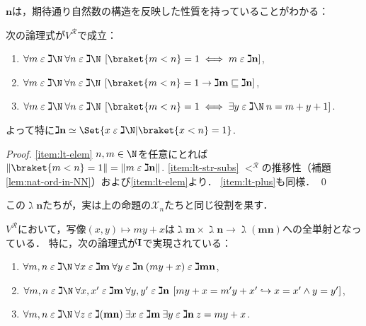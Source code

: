 \documentclass[realisability.tex]{subfiles}
\begin{document}
$\mathbf{n}$は，期待通り自然数の構造を反映した性質を持っていることがわかる：
\begin{lemma}\label{lem:gimel-n-props}
 次の論理式が$V^{\mathcal{R}}$で成立：
 \begin{enumerate}
  \item \label{item:lt-elem}$\forall m \strin \gimel \N\: \forall n \strin \gimel \N\: \left[ \braket{m < n} = 1 \iff m \strin \gimel\mathbf{n}\right]$,
  \item \label{item:lt-str-subs}$\forall m \strin \gimel \N\: \forall n \strin \gimel \N\: \left[ \braket{m < n} = 1 \to \gimel \mathbf{m} \sqsubseteq \gimel \mathbf{n}\right]$,
  \item \label{item:lt-plus}$\forall m \strin \gimel \N\: \forall n \strin \gimel \N\: \left[ \braket{m < n} = 1 \iff \exists y \strin \gimel \N\: n = m + y + 1\right]$.
 \end{enumerate}
 よって特に$\gimel \mathbf{n} \simeq \Set{x \strin \gimel \N | \braket{x < n} = 1}$.
\end{lemma}
\begin{proof}
 \ref{item:lt-elem} $n, m \in \N$を任意にとれば$\|\braket{m < n} = 1\| = \|m \strin \gimel \mathbf{n}\|$.
 \ref{item:lt-str-subs} $<^{\mathcal{R}}$の推移性（補題\ref{lem:nat-ord-in-NN}）および\ref{item:lt-elem}より．
 \ref{item:lt-plus}も同様． \qed
\end{proof}
この$\gimel\mathbf{n}$たちが，実は上の命題の$\mathcal{X}_n$たちと同じ役割を果す．
\begin{lemma}\label{lem:natural-bij-prod}
 $V^{\mathcal{R}}$において，写像$(x, y) \mapsto my + x$は$\gimel \mathbf{m} \times \gimel \mathbf{n} \to \gimel(\mathbf{mn})$への全単射となっている．
 特に，次の論理式が$\mathsf{\mathbf{I}}$で実現されている：
 \begin{enumerate}
  \item $\forall m, n \strin \gimel \N\: \forall x \strin \gimel \mathbf{m}\: \forall y \strin \gimel \mathbf{n}\: (my + x) \strin \gimel \mathbf{mn}$,
  \item $\forall m, n \strin \gimel \N\:
         \forall x, x' \strin \gimel \mathbf{m} \: \forall y, y' \strin \gimel \mathbf{n}\:
         \left[ my + x = m'y + x' \hookrightarrow x = x'\land y = y' \right]$,
  \item $\forall m,n \strin \gimel \N\:\forall z \strin \gimel(\mathbf{mn}) \:
         \exists x \strin \gimel \mathbf{m} \: \exists y \strin \gimel \mathbf{n}\:
         z = my + x$.
 \end{enumerate}
\end{lemma}
\end{document}

